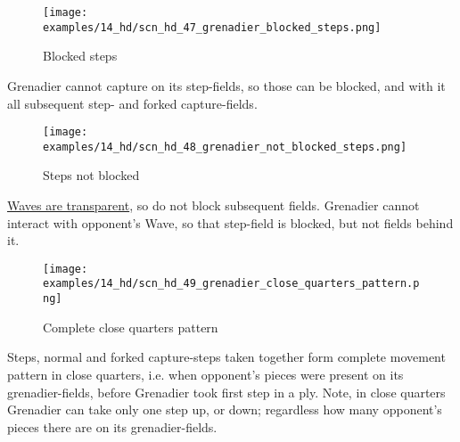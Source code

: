 \clearpage %

\vspace*{-1.7\baselineskip}
\noindent
\begin{wrapfigure}[4]{l}{0.41\textwidth}
\centering
\texttt{[image: examples/14\_hd/scn\_hd\_47\_grenadier\_blocked\_steps.png]}
\vspace*{-0.5\baselineskip}
\caption{Blocked steps}
\label{fig:scn_hd_47_grenadier_blocked_steps}
\end{wrapfigure}
Grenadier cannot capture on its step-fields, so those can be blocked, and with it
all subsequent step- and forked capture-fields.

\vspace*{2.3\baselineskip}
\noindent
\begin{wrapfigure}[5]{l}{0.41\textwidth}
\centering
\texttt{[image: examples/14\_hd/scn\_hd\_48\_grenadier\_not\_blocked\_steps.png]}
\vspace*{-0.5\baselineskip}
\caption{Steps not blocked}
\label{fig:scn_hd_48_grenadier_not_blocked_steps}
\end{wrapfigure}
\hyperref[fig:scn_mv_07_wave_is_transparent]{Waves are transparent}, so do not block
subsequent fields. Grenadier cannot interact with opponent's Wave, so that step-field
is blocked, but not fields behind it.

\vspace*{1.0\baselineskip}
\noindent
\begin{figure}[!h]
\texttt{[image: examples/14\_hd/scn\_hd\_49\_grenadier\_close\_quarters\_pattern.png]}
\vspace*{-1.3\baselineskip}
\caption{Complete close quarters pattern}
\label{fig:scn_hd_49_grenadier_close_quarters_pattern}
\end{figure}

\vspace*{-0.5\baselineskip}
Steps, normal and forked capture-steps taken together form complete movement pattern
in close quarters, i.e. when opponent's pieces were present on its grenadier-fields,
before Grenadier took first step in a ply. \newline
\indent
Note, in close quarters Grenadier can take only one step up, or down; regardless how
many opponent's pieces there are on its grenadier-fields.

\clearpage %

